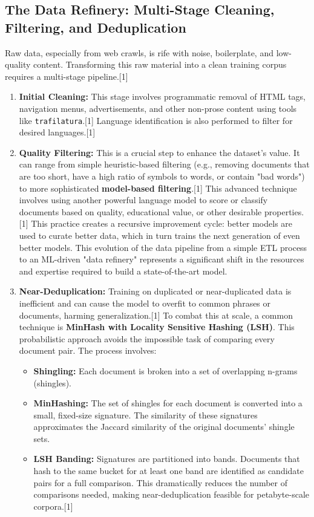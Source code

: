 \documentclass[12pt, a4paper]{article}
\begin{document}
\subsection{The Data Refinery: Multi-Stage Cleaning, Filtering, and Deduplication}

Raw data, especially from web crawls, is rife with noise, boilerplate, and low-quality content. Transforming this raw material into a clean training corpus requires a multi-stage pipeline.[1]

\begin{enumerate}
    \item \textbf{Initial Cleaning:} This stage involves programmatic removal of HTML tags, navigation menus, advertisements, and other non-prose content using tools like \texttt{trafilatura}.[1] Language identification is also performed to filter for desired languages.[1]
    \item \textbf{Quality Filtering:} This is a crucial step to enhance the dataset's value. It can range from simple heuristic-based filtering (e.g., removing documents that are too short, have a high ratio of symbols to words, or contain "bad words") to more sophisticated \textbf{model-based filtering}.[1] This advanced technique involves using another powerful language model to score or classify documents based on quality, educational value, or other desirable properties.[1] This practice creates a recursive improvement cycle: better models are used to curate better data, which in turn trains the next generation of even better models. This evolution of the data pipeline from a simple ETL process to an ML-driven "data refinery" represents a significant shift in the resources and expertise required to build a state-of-the-art model.
    \item \textbf{Near-Deduplication:} Training on duplicated or near-duplicated data is inefficient and can cause the model to overfit to common phrases or documents, harming generalization.[1] To combat this at scale, a common technique is \textbf{MinHash with Locality Sensitive Hashing (LSH)}. This probabilistic approach avoids the impossible task of comparing every document pair. The process involves:
    \begin{itemize}
        \item \textbf{Shingling:} Each document is broken into a set of overlapping n-grams (shingles).
        \item \textbf{MinHashing:} The set of shingles for each document is converted into a small, fixed-size signature. The similarity of these signatures approximates the Jaccard similarity of the original documents' shingle sets.
        \item \textbf{LSH Banding:} Signatures are partitioned into bands. Documents that hash to the same bucket for at least one band are identified as candidate pairs for a full comparison. This dramatically reduces the number of comparisons needed, making near-deduplication feasible for petabyte-scale corpora.[1]
    \end{itemize}
\end{enumerate}
\end{document}
